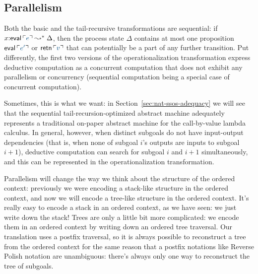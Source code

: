 
\subsection{Parallelism}
\label{sec:trans-par}

Both the basic and the tail-recursive transformations
are sequential: if $x{:}{\sf eval}\,\interp{e} \leadsto^* \Delta$,
then the process state $\Delta$ contains at most one proposition ${\sf
  eval}\,\interp{e'}$ or ${\sf retn}\,\interp{v}$ that can potentially
be a part of any further transition. Put differently, the first two
versions of the operationalization transformation express deductive
computation as a concurrent computation that does not exhibit any
parallelism or concurrency (sequential computation being a special
case of concurrent computation).

Sometimes, this is what we want: in
Section~\ref{sec:nat-ssos-adequacy} we will see that the sequential
tail-recursion-optimized abstract machine 
adequately represents a traditional on-paper abstract machine for
the call-by-value lambda calculus. In general, however, when distinct
subgoals do not have input-output dependencies (that is, when none of
subgoal $i$'s outputs are inputs to subgoal $i+1$), deductive computation
can search for subgoal $i$ and $i+1$ simultaneously, and this can 
be represented in the operationalization transformation.

Parallelism will change the way we think about the structure of the
ordered context: previously we were encoding a stack-like structure in
the ordered context, and now we will encode a tree-like structure in
the ordered context. It's really easy to encode a stack in an ordered
context, as we have seen: we just write down the stack!  Trees are
only a little bit more complicated: we encode them in an ordered
context by writing down an ordered tree traversal. Our translation
uses a postfix traversal, so it is always possible to reconstruct a
tree from the ordered context for the same reason that a postfix
notations like Reverse Polish notation are unambiguous: there's always
only one way to reconstruct the tree of subgoals.

